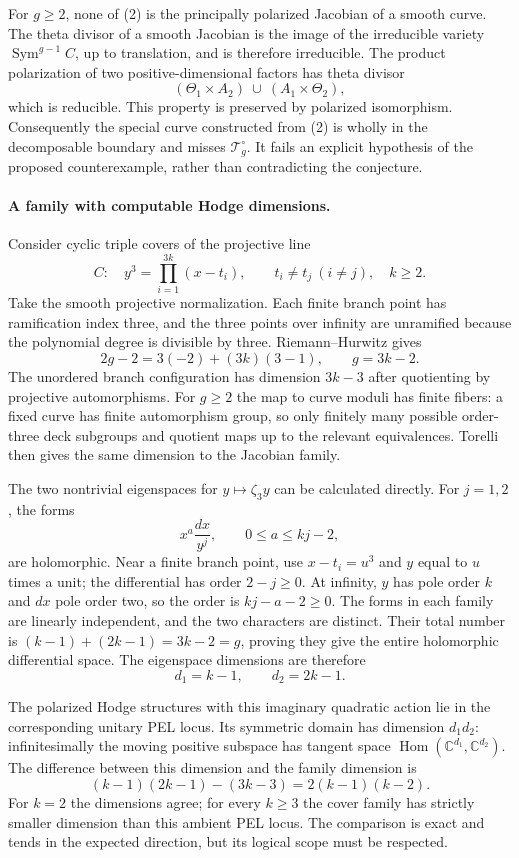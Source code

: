 \documentclass[11pt]{article}
\begin{document}
For $g\ge2$, none of (2) is the principally polarized Jacobian of a
smooth curve. The theta divisor of a smooth Jacobian is the image of
the irreducible variety $\operatorname{Sym}^{g-1}C$, up to translation,
and is therefore irreducible. The product polarization of two
positive-dimensional factors has theta divisor
\[
 (\Theta_1\times A_2)\ \cup\ (A_1\times\Theta_2),
\]
which is reducible. This property is preserved by polarized
isomorphism. Consequently the special curve constructed from (2) is
wholly in the decomposable boundary and misses
$\mathcal T_g^\circ$. It fails an explicit hypothesis of the proposed
counterexample, rather than contradicting the conjecture.

\paragraph{A family with computable Hodge dimensions.}
Consider cyclic triple covers of the projective line
\[
 C:\quad y^3=\prod_{i=1}^{3k}(x-t_i),
 \qquad t_i\ne t_j\ (i\ne j),\quad k\ge2.            \tag{3}
\]
Take the smooth projective normalization. Each finite branch point
has ramification index three, and the three points over infinity are
unramified because the polynomial degree is divisible by three.
Riemann--Hurwitz gives
\[
 2g-2=3(-2)+(3k)(3-1),\qquad g=3k-2.                \tag{4}
\]
The unordered branch configuration has dimension $3k-3$ after
quotienting by projective automorphisms. For $g\ge2$ the map to curve
moduli has finite fibers: a fixed curve has finite automorphism group,
so only finitely many possible order-three deck subgroups and quotient
maps up to the relevant equivalences. Torelli then gives the same
dimension to the Jacobian family.

The two nontrivial eigenspaces for $y\mapsto\zeta_3 y$ can be
calculated directly. For $j=1,2$, the forms
\[
 x^a\frac{dx}{y^j},\qquad 0\le a\le kj-2,
                                                        \tag{5}
\]
are holomorphic. Near a finite branch point, use $x-t_i=u^3$ and
$y$ equal to $u$ times a unit; the differential has order $2-j\ge0$.
At infinity, $y$ has pole order $k$ and $dx$ pole order two, so the
order is $kj-a-2\ge0$. The forms in each family are linearly
independent, and the two characters are distinct. Their total number
is $(k-1)+(2k-1)=3k-2=g$, proving they give the entire holomorphic
differential space. The eigenspace dimensions are therefore
\[
 d_1=k-1,\qquad d_2=2k-1.                            \tag{6}
\]

The polarized Hodge structures with this imaginary quadratic action
lie in the corresponding unitary PEL locus. Its symmetric domain has
dimension $d_1d_2$: infinitesimally the moving positive subspace has
tangent space $\operatorname{Hom}(\mathbb C^{d_1},\mathbb C^{d_2})$.
The difference between this dimension and the family dimension is
\[
 (k-1)(2k-1)-(3k-3)=2(k-1)(k-2).                    \tag{7}
\]
For $k=2$ the dimensions agree; for every $k\ge3$ the cover family
has strictly smaller dimension than this ambient PEL locus. The
comparison is exact and tends in the expected direction, but its
logical scope must be respected.
\end{document}

